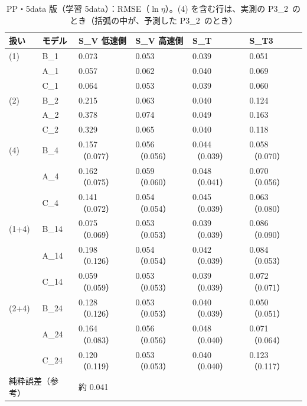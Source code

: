 \documentclass[paper=a4paper,fontsize=10.5pt,line_length=44zw,number_of_lines=38]{jlreq}
\newcommand{\PII}{P3\_2}
\begin{document}
\begin{table}[H]
\caption{PP・5data 版（学習 5data）：RMSE（$\ln\eta$）。(4) を含む行は、実測の \PII\ のとき（括弧の中が、予測した \PII\ のとき）}\label{tab:met_5data_PP}
\footnotesize
\begin{tabularx}{\linewidth}{@{}llXXXX@{}}
\toprule
扱い & モデル & S\_V 低速側 & S\_V 高速側 & S\_T & S\_T3 \\
\midrule
(1) & B\_1 & 0.073 & 0.053 & 0.039 & 0.051 \\
 & A\_1 & 0.057 & 0.062 & 0.040 & 0.069 \\
 & C\_1 & 0.064 & 0.053 & 0.039 & 0.060 \\
\midrule
(2) & B\_2 & 0.215 & 0.063 & 0.040 & 0.124 \\
 & A\_2 & 0.378 & 0.074 & 0.049 & 0.163 \\
 & C\_2 & 0.329 & 0.065 & 0.040 & 0.118 \\
\midrule
(4) & B\_4 & 0.157（0.077） & 0.056（0.056） & 0.044（0.039） & 0.058（0.070） \\
 & A\_4 & 0.162（0.075） & 0.059（0.060） & 0.048（0.041） & 0.070（0.056） \\
 & C\_4 & 0.141（0.072） & 0.054（0.054） & 0.045（0.039） & 0.063（0.080） \\
\midrule
(1+4) & B\_14 & 0.075（0.069） & 0.053（0.053） & 0.039（0.039） & 0.086（0.090） \\
 & A\_14 & 0.198（0.126） & 0.054（0.054） & 0.042（0.039） & 0.084（0.053） \\
 & C\_14 & 0.059（0.059） & 0.053（0.053） & 0.039（0.039） & 0.072（0.071） \\
\midrule
(2+4) & B\_24 & 0.128（0.126） & 0.053（0.053） & 0.040（0.039） & 0.050（0.051） \\
 & A\_24 & 0.164（0.083） & 0.056（0.056） & 0.048（0.040） & 0.071（0.064） \\
 & C\_24 & 0.120（0.119） & 0.053（0.053） & 0.040（0.040） & 0.123（0.117） \\
\multicolumn{2}{l}{純粋誤差（参考）} & \multicolumn{4}{l}{約 0.041} \\
\bottomrule
\end{tabularx}
\end{table}
\end{document}
